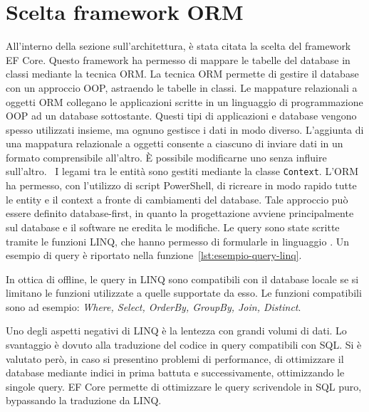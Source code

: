 \section{Scelta framework ORM}
All'interno della sezione sull'architettura, è stata citata la scelta del framework \ac{EF Core}.
Questo framework ha permesso di mappare le tabelle del database in classi mediante la tecnica \ac{ORM}.
La tecnica \ac{ORM} permette di gestire il database con un approccio \ac{OOP}, astraendo le tabelle in classi.
Le mappature relazionali a oggetti \ac{ORM} collegano le applicazioni scritte in un linguaggio di programmazione
\ac{OOP} ad un database sottostante.
Questi tipi di applicazioni e database vengono spesso utilizzati insieme,
ma ognuno gestisce i dati in modo diverso. L’aggiunta di una mappatura relazionale
a oggetti consente a ciascuno di inviare dati in un formato comprensibile all’altro.
È possibile modificarne uno senza influire sull’altro.~\cite{ORM}
I legami tra le entità sono gestiti mediante la classe \texttt{Context}.
L'\ac{ORM} ha permesso, con l'utilizzo di script PowerShell,
di ricreare in modo rapido tutte le entity e il context a fronte di cambiamenti del database.
Tale approccio può essere definito database-first, in quanto la progettazione avviene principalmente sul database
e il software ne eredita le modifiche.
Le query sono state scritte tramite le funzioni \ac{LINQ}, che hanno permesso di formularle in linguaggio \csharp{}.
Un esempio di query è riportato nella funzione~\ref{lst:esempio-query-linq}.


In ottica di offline, le query in \ac{LINQ} sono compatibili con il database locale \sqlite{} se si limitano
le funzioni utilizzate a quelle supportate da esso.
Le funzioni compatibili sono ad esempio: \textit{Where, Select, OrderBy, GroupBy, Join, Distinct}.

Uno degli aspetti negativi di \ac{LINQ} è la lentezza con grandi volumi di dati.
Lo svantaggio è dovuto alla traduzione del codice in query compatibili con \ac{SQL}.
Si è valutato però, in caso si presentino problemi di performance,
di ottimizzare il database mediante indici in prima battuta
e successivamente, ottimizzando le singole query.
\ac{EF Core} permette di ottimizzare le query scrivendole in \ac{SQL} puro,
bypassando la traduzione da \ac{LINQ}.

